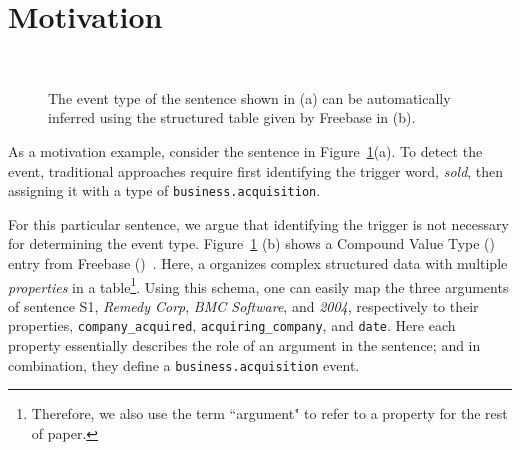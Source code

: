 \section{Motivation}
\begin{figure}
  \centering
   \\
  \caption{The event type of the sentence shown in (a) can be automatically inferred using the structured table given by Freebase in (b).}
  \label{fig:example}
\end{figure}


As a motivation example, consider the sentence %
in Figure~\ref{fig:example}(a). To detect the event, 
traditional approaches require first identifying the trigger word, \emph{sold}, then assigning it with a type of \texttt{business.acquisition}.


For this particular sentence, we argue that identifying the trigger is not necessary for determining the event type.
Figure~\ref{fig:example} (b) shows a Compound Value Type (\CVT) entry from Freebase (\FB)~\cite{bollacker2008freebase}. Here, a \CVT
organizes complex structured data with multiple \emph{properties} in a table\footnote{Therefore, we also use the term ``argument" to refer
to a \CVT property for the rest of paper.}. Using this \CVT schema, one can easily map the three arguments of sentence S1, \emph{Remedy
Corp}, \emph{BMC Software}, and \emph{2004}, respectively to their properties, \texttt{company\_acquired}, \texttt{acquiring\_company}, and
\texttt{date}. Here each property essentially describes the role of an argument in the sentence; and in combination, they define a
\texttt{business.acquisition} event.

